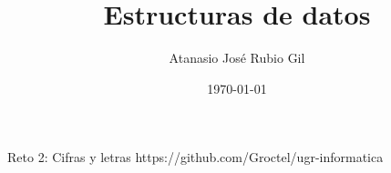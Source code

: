 \documentclass[10pt]{report}
\author{Atanasio José Rubio Gil}
\title{Estructuras de datos}
\date{\today}
\begin{document}
            {Reto 2: Cifras y letras}
            {https://github.com/Groctel/ugr-informatica}
\tableofcontents

       \pagebreak
 \pagebreak
      \pagebreak
         \pagebreak

\end{document}
